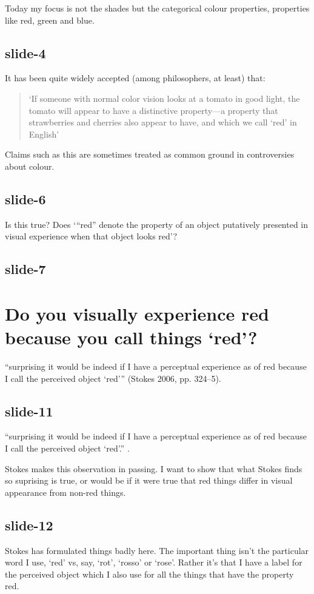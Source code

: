 \documentclass[12pt,\papersize]{extarticle}
\begin{document}
Today my focus is not the shades but the categorical colour properties,
properties like red, green and blue.

\subsection{slide-4}
It has been quite widely accepted (among philosophers, at least)  that:
%
\begin{quote}
‘If someone with normal color vision looks at a tomato in good light, the tomato will appear to have a distinctive property—a property that strawberries and cherries also appear to have, and which we call ‘red’ in English’ \citep[p.\ 4]{byrne:2003_color}
\end{quote}
%
Claims such as this are sometimes treated as common ground in controversies about colour.

\subsection{slide-6}
Is this true?
Does ‘“red” denote the property of an object putatively presented in visual experience
when that object looks red’?

\subsection{slide-7}


\section{Do you visually experience red because you call things ‘red’?}

“surprising it would be indeed if I have a perceptual experience as of red
because I call the perceived object ‘red’”
(Stokes 2006, pp. 324--5).

\subsection{slide-11}
“surprising it would be indeed if I have a perceptual experience as of red because I call the perceived object ‘red’.”
\citep[pp.~324--5]{Stokes:2006fd}.

Stokes makes this observation in passing.  I want to show
that what Stokes finds so suprising is true, or would be if it were true that
red things differ in visual appearance from non-red things.

\subsection{slide-12}
Stokes has formulated things badly here.
The important thing isn’t the particular word I use, ‘red’ vs, say, ‘rot’,
‘rosso’ or ‘rose’.
Rather it’s that I have a label for the perceived object which I also
use for all the things that have the property red.
\end{document}
